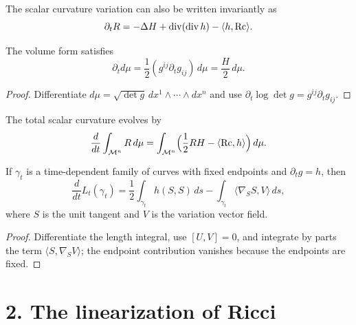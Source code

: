 \begin{remark}
\label{ch03-rem-scalar-curvature-invariant-form}
The scalar curvature variation can also be written invariantly as
\[
\partial_t R=-\Delta H+\operatorname{div}(\operatorname{div} h)-\langle h,\operatorname{Rc}\rangle.
\]
\end{remark}

\begin{lemma}
\label{ch03-lem-volume-element-evolves}
The volume form satisfies
\[
\partial_t d\mu=\frac12(g^{ij}\partial_t g_{ij})\,d\mu=\frac{H}{2}\,d\mu.
\]
\end{lemma}

\begin{proof}
Differentiate \(d\mu=\sqrt{\det g}\,dx^1\wedge\cdots\wedge dx^n\) and use \(\partial_t\log\det g=g^{ij}\partial_t g_{ij}\).
\end{proof}

\begin{corollary}
\label{ch03-cor-total-scalar-curvature-evolves}
The total scalar curvature evolves by
\[
\frac{d}{dt}\int_{\mathcal{M}^n}R\,d\mu
=\int_{\mathcal{M}^n}\Bigl(\frac12 RH-\langle \operatorname{Rc},h\rangle\Bigr)\,d\mu.
\]
\end{corollary}

\begin{lemma}
\label{ch03-lem-length-evolves}
If \(\gamma_t\) is a time-dependent family of curves with fixed endpoints and \(\partial_t g=h\), then
\[
\frac{d}{dt}L_t(\gamma_t)
=\frac12\int_{\gamma_t}h(S,S)\,ds-\int_{\gamma_t}\langle\nabla_S S,V\rangle\,ds,
\]
where \(S\) is the unit tangent and \(V\) is the variation vector field.
\end{lemma}

\begin{proof}
Differentiate the length integral, use \([U,V]=0\), and integrate by parts the term \(\langle S,\nabla_S V\rangle\); the endpoint contribution vanishes because the endpoints are fixed.
\end{proof}

\section*{2. The linearization of Ricci}

